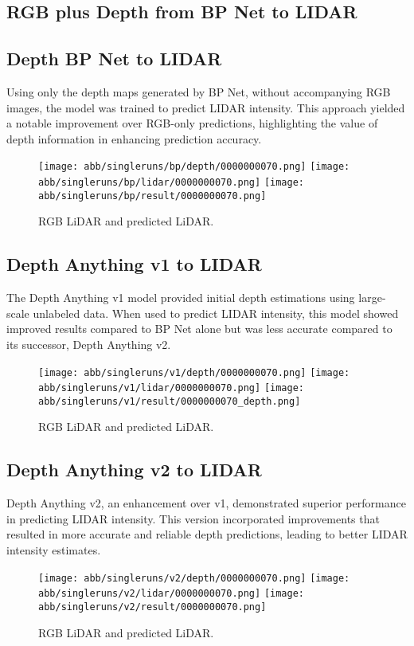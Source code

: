 \subsection{RGB plus Depth from BP Net to LIDAR}

\subsection{Depth BP Net to LIDAR}

Using only the depth maps generated by BP Net, without accompanying RGB images, the model was trained to predict LIDAR intensity. This approach yielded a notable improvement over RGB-only predictions, highlighting the value of depth information in enhancing prediction accuracy.
\begin{figure}[!ht]
	\centering
	\texttt{[image: abb/singleruns/bp/depth/0000000070.png]}
	\texttt{[image: abb/singleruns/bp/lidar/0000000070.png]}
	\texttt{[image: abb/singleruns/bp/result/0000000070.png]}
	\caption{RGB LiDAR and predicted LiDAR.}
	\label{depth}
\end{figure}
\subsection{Depth Anything v1 to LIDAR}

The Depth Anything v1 model provided initial depth estimations using large-scale unlabeled data. When used to predict LIDAR intensity, this model showed improved results compared to BP Net alone but was less accurate compared to its successor, Depth Anything v2.
\begin{figure}[!ht]
	\centering
	\texttt{[image: abb/singleruns/v1/depth/0000000070.png]}
	\texttt{[image: abb/singleruns/v1/lidar/0000000070.png]}
	\texttt{[image: abb/singleruns/v1/result/0000000070\_depth.png]}
	\caption{RGB LiDAR and predicted LiDAR.}
	\label{depth}
\end{figure}
\subsection{Depth Anything v2 to LIDAR}

Depth Anything v2, an enhancement over v1, demonstrated superior performance in predicting LIDAR intensity. This version incorporated improvements that resulted in more accurate and reliable depth predictions, leading to better LIDAR intensity estimates.
\begin{figure}[!ht]
	\centering
	\texttt{[image: abb/singleruns/v2/depth/0000000070.png]}
	\texttt{[image: abb/singleruns/v2/lidar/0000000070.png]}
	\texttt{[image: abb/singleruns/v2/result/0000000070.png]}
	\caption{RGB LiDAR and predicted LiDAR.}
	\label{depth}
\end{figure}
